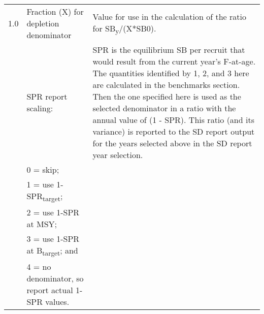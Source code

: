 {\begin{landscape}
\begin{longtable}{p{1.5cm} p{7.2cm} p{12.3cm}}
 \hline
 1.0 & Fraction (X) for depletion denominator & Value for use in the calculation of the ratio for SB\textsubscript{y}/(X*SB0). \Tstrut\Bstrut\\

 \pagebreak
 1 & SPR report scaling: & \multirow{1}{1cm}[-0.25cm]{\parbox{12.5cm}{SPR is the equilibrium SB per recruit that would result from the current year's F-at-age. The quantities identified by 1, 2, and 3 here are calculated in the benchmarks section. Then the one specified here is used as the selected denominator in a ratio with the annual value of (1 - SPR). This ratio (and its variance) is reported to the SD report output for the years selected above in the SD report year selection.}} \Tstrut\\
   & 0 = skip; & \\
   & 1 = use 1-SPR\textsubscript{target}; & \\
   & 2 = use 1-SPR at MSY; & \Tstrut\\
   & 3 = use 1-SPR at B\textsubscript{target}; and &  \Tstrut\\
   & 4 = no denominator, so report actual 1-SPR values. & \\
  

\end{longtable}
\end{landscape}}

